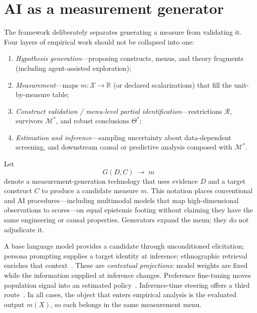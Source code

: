 \documentclass[10pt,letterpaper]{article}
\newcommand{\M}{\ensuremath{\mathcal{M}}}
\newcommand{\Rset}{\mathcal{R}}
\begin{document}
\section{AI as a measurement generator}
\label{sec:ai}
The framework deliberately separates generating a measure from validating it.
Four layers of empirical work should not be collapsed into one:
\begin{enumerate}[label=(\roman*)]
\item \emph{Hypothesis generation}---proposing constructs, menus, and theory fragments (including agent-assisted exploration);
\item \emph{Measurement}---maps $m:\mathcal{X}\to\mathbb{R}$ (or declared scalarizations) that fill the unit-by-measure table;
\item \emph{Construct validation / menu-level partial identification}---restrictions $\Rset$, survivors $\M^*$, and robust conclusions $\Theta^*$;
\item \emph{Estimation and inference}---sampling uncertainty about data-dependent screening, and downstream causal or predictive analysis composed with $\M^*$.
\end{enumerate}
Let
\begin{equation}
G(D,C)\;\longrightarrow\; m
\label{eq:generator}
\end{equation}
denote a measurement-generation technology that uses evidence $D$ and a target construct $C$ to produce a candidate measure $m$.
This notation places conventional and AI procedures---including multimodal models that map high-dimensional observations to scores---on equal epistemic footing without claiming they have the same engineering or causal properties.
Generators expand the menu; they do not adjudicate it.

A base language model provides a candidate through unconditioned elicitation; persona prompting supplies a target identity at inference; ethnographic retrieval enriches that context~\cite{capra2025}.
These are \emph{contextual projections}: model weights are fixed while the information supplied at inference changes.
Preference fine-tuning moves population signal into an estimated policy~\cite{rafailov2023,plural2026,palms2026}.
Inference-time steering offers a third route~\cite{disca2026}.
In all cases, the object that enters empirical analysis is the evaluated output $m(X)$, so each belongs in the same measurement menu.
\end{document}

